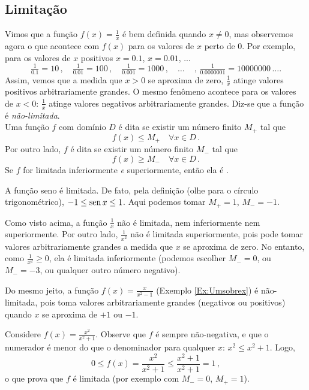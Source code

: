 \subsection{Limitação}
Vimos que a função $f(x)=\tfrac{1}{x}$ é bem definida quando $x\neq 0$, mas observemos
agora o que acontece com $f(x)$ para os valores de $x$ perto de $0$. Por exemplo, para os
valores de $x$ positivos $x=0.1$, $x=0.01$, ...
$$
 \tfrac{1}{0.1}=10\,,\quad \tfrac{1}{0.01}=100\,,\quad
\tfrac{1}{0.001}=1000\,,\quad\dots\quad\,,\,\tfrac{1}{0.0000001}=10000000\,\dots.
$$
Assim, vemos que a medida que $x>0$ se aproxima de zero, $\tfrac{1}{x}$ atinge valores
positivos arbitrariamente grandes. O mesmo fenômeno acontece para os valores de $x<0$:
$\tfrac{1}{x}$ atinge valores negativos arbitrariamente grandes.
Diz-se que a função é \emph{não-limitada}.\\

Uma função $f$ com domínio $D$ é dita  se existir um 
número finito $M_+$
tal que
$$f(x)\leq M_+\quad \forall x\in D\,.$$
Por outro lado, $f$ é dita  se existir um número
finito $M_-$ tal que
$$f(x)\geq M_-\quad \forall x\in D\,.$$
Se $f$ for limitada inferiormente \emph{e} superiormente, então ela é
.\\

\begin{ex}
A função seno é limitada. De fato, pela definição (olhe para o círculo trigonométrico),
$-1\leq \operatorname{sen} x\leq 1$. Aqui podemos tomar $M_+=1$, $M_-=-1$.
\end{ex}

\begin{ex} Como visto acima, a função $\tfrac{1}{x}$ não é limitada, nem
inferiormente nem superiormente. 
Por outro lado, $\tfrac{1}{x^2}$ não é limitada superiormente, pois
pode tomar valores arbitrariamente grandes a medida que $x$ se aproxima de zero.
No entanto, como $\tfrac{1}{x^2}\geq 0$, ela é limitada inferiormente
(podemos escolher $M_-=0$, ou $M_-=-3$, ou qualquer outro número negativo).

Do mesmo jeito, a função $f(x)=\frac{x}{x^2-1}$ (Exemplo
\ref{Ex:Umsobrex}) é não-limitada, pois toma valores arbitrariamente grandes
(negativos ou positivos) quando $x$ se aproxima de $+1$ ou $-1$.
\end{ex}

\begin{ex}
 Considere $f(x)=\frac{x^2}{x^2+1}$. Observe que $f$ é sempre não-negativa, e que o
numerador é menor do que o denominador para qualquer $x$: $x^2\leq x^2+1$. Logo,
$$0\leq f(x)=\frac{x^2}{x^2+1}\leq \frac{x^2+1}{x^2+1}=1\,,$$
o que prova que $f$ é limitada (por exemplo com $M_-=0$, $M_+=1$).
\end{ex}

